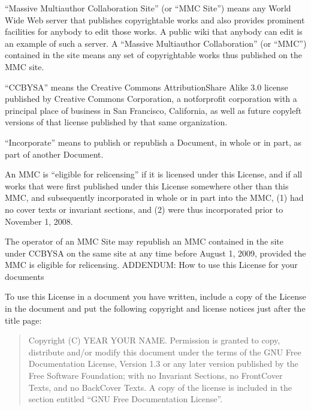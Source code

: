 \documentclass[letterpaper,10pt,english]{sphinxmanual}
\begin{document}
\sphinxAtStartPar
“Massive Multiauthor Collaboration Site” (or “MMC Site”) means any World Wide Web server that publishes copyrightable works and also provides prominent facilities for anybody to edit those works. A public wiki that anybody can edit is an example of such a server. A “Massive Multiauthor Collaboration” (or “MMC”) contained in the site means any set of copyrightable works thus published on the MMC site.

\sphinxAtStartPar
“CC\sphinxhyphen{}BY\sphinxhyphen{}SA” means the Creative Commons Attribution\sphinxhyphen{}Share Alike 3.0 license published by Creative Commons Corporation, a not\sphinxhyphen{}for\sphinxhyphen{}profit corporation with a principal place of business in San Francisco, California, as well as future copyleft versions of that license published by that same organization.

\sphinxAtStartPar
“Incorporate” means to publish or republish a Document, in whole or in part, as part of another Document.

\sphinxAtStartPar
An MMC is “eligible for relicensing” if it is licensed under this License, and if all works that were first published under this License somewhere other than this MMC, and subsequently incorporated in whole or in part into the MMC, (1) had no cover texts or invariant sections, and (2) were thus incorporated prior to November 1, 2008.

\sphinxAtStartPar
The operator of an MMC Site may republish an MMC contained in the site under CC\sphinxhyphen{}BY\sphinxhyphen{}SA on the same site at any time before August 1, 2009, provided the MMC is eligible for relicensing.
ADDENDUM: How to use this License for your documents

\sphinxAtStartPar
To use this License in a document you have written, include a copy of the License in the document and put the following copyright and license notices just after the title page:
\begin{quote}

\sphinxAtStartPar
Copyright (C)  YEAR  YOUR NAME.
Permission is granted to copy, distribute and/or modify this document
under the terms of the GNU Free Documentation License, Version 1.3
or any later version published by the Free Software Foundation;
with no Invariant Sections, no Front\sphinxhyphen{}Cover Texts, and no Back\sphinxhyphen{}Cover Texts.
A copy of the license is included in the section entitled “GNU
Free Documentation License”.
\end{quote}
\end{document}
